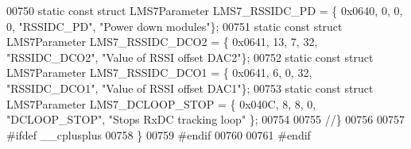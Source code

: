 \begin{DoxyCode}
00750 \textcolor{keyword}{static} \textcolor{keyword}{const} \textcolor{keyword}{struct }LMS7Parameter LMS7_RSSIDC_PD = \{ 0x0640, 0, 0, 0, \textcolor{stringliteral}{"RSSIDC\_PD"}, \textcolor{stringliteral}{"Power down modules"}\};
00751 \textcolor{keyword}{static} \textcolor{keyword}{const} \textcolor{keyword}{struct }LMS7Parameter LMS7_RSSIDC_DCO2 = \{ 0x0641, 13, 7, 32, \textcolor{stringliteral}{"RSSIDC\_DCO2"}, \textcolor{stringliteral}{"Value of RSSI
       offset DAC2"}\};
00752 \textcolor{keyword}{static} \textcolor{keyword}{const} \textcolor{keyword}{struct }LMS7Parameter LMS7_RSSIDC_DCO1 = \{ 0x0641, 6, 0, 32, \textcolor{stringliteral}{"RSSIDC\_DCO1"}, \textcolor{stringliteral}{"Value of RSSI
       offset DAC1"}\};
00753 \textcolor{keyword}{static} \textcolor{keyword}{const} \textcolor{keyword}{struct }LMS7Parameter LMS7_DCLOOP_STOP = \{ 0x040C, 8, 8, 0, \textcolor{stringliteral}{"DCLOOP\_STOP"}, \textcolor{stringliteral}{"Stops RxDC tracking
       loop"} \};
00754 
00755 \textcolor{comment}{//\}}
00756 
00757 \textcolor{preprocessor}{#ifdef \_\_cplusplus}
00758 \}
00759 \textcolor{preprocessor}{#endif}
00760 
00761 \textcolor{preprocessor}{#endif}
\end{DoxyCode}
